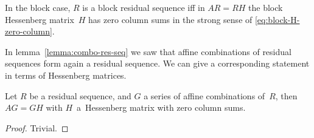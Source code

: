 \begin{block}
In the block case, $R$ is a block residual sequence iff
in $AR=RH$ the block Hessenberg matrix~$H$ has zero column sums
in the strong sense of \eqref{eq:block-H-zero-column}.
\end{block}

In lemma~\ref{lemma:combo-res-seq} we saw that affine combinations of
residual sequences form again a residual sequence. We can give a
corresponding statement in terms of Hessenberg matrices.
\begin{lemma}
Let $R$ be a residual sequence, and $G$ a series of affine
combinations of~$R$, then $AG=GH$ with $H$~a~Hessenberg matrix with
zero column sums.
\end{lemma}
\begin{proof}
Trivial.
\end{proof}

